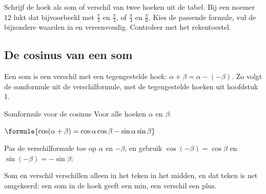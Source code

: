 \begin{werkwijze}
Schrijf de hoek als som of verschil van twee hoeken uit de tabel. Bij een noemer $12$ lukt dat bijvoorbeeld met $\frac{\pi}{3}$ en $\frac{\pi}{4}$, of $\frac{\pi}{4}$ en $\frac{\pi}{6}$. Kies de passende formule, vul de bijzondere waarden in en vereenvoudig. Controleer met het rekentoestel.
\end{werkwijze}

\begin{oefeningen}
\end{oefeningen}

\subsection{De cosinus van een som}

Een som is een verschil met een tegengestelde hoek: $\alpha + \beta = \alpha - (-\beta)$. Zo volgt de somformule uit de verschilformule, met de tegengestelde hoeken uit hoofdstuk 1.

\begin{theorie}
\begin{stelling}{Somformule voor de cosinus}
Voor alle hoeken $\alpha$ en $\beta$:

\vspace{1mm}
\qquad $\formule{\cos(\alpha + \beta) = \cos\alpha\cos\beta - \sin\alpha\sin\beta}$
\end{stelling}
\begin{bewijs}
Pas de verschilformule toe op $\alpha$ en $-\beta$, en gebruik $\cos(-\beta) = \cos\beta$ en $\sin(-\beta) = -\sin\beta$:
\end{bewijs}
\end{theorie}

Som en verschil verschillen alleen in het teken in het midden, en dat teken is net omgekeerd: een som in de hoek geeft een min, een verschil een plus.


